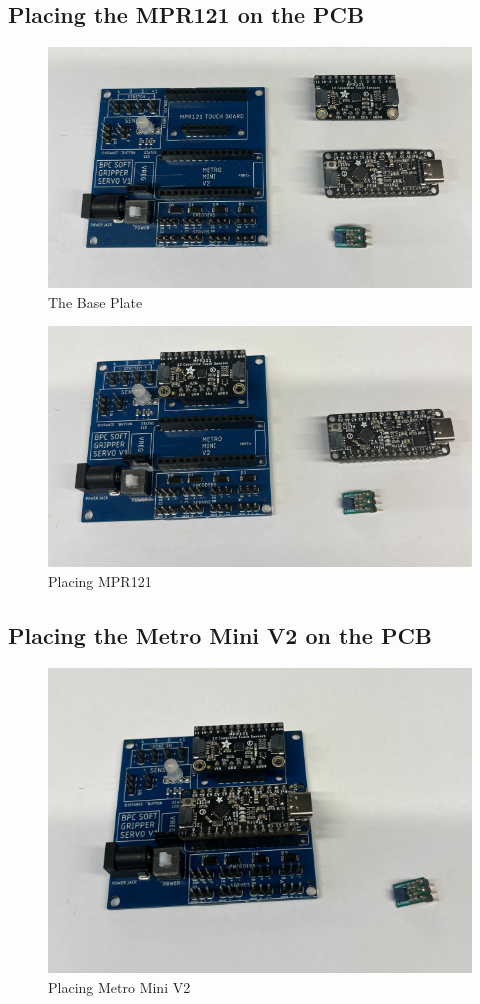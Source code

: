 \documentclass{article}
\begin{document}
\subsection{Placing the MPR121 on the PCB}
\begin{figure}[H]
    \centering
    \includegraphics[width=0.5\linewidth]{PCBImages/PlacingPCBComponents/placing_pcb_components_2.png}
    \caption{The Base Plate}
    \label{fig:enter-label}
\end{figure}
\begin{figure}[H]
    \centering
    \includegraphics[width=0.5\linewidth]{PCBImages/PlacingPCBComponents/placing_pcb_components_1.png}
    \caption{Placing MPR121}
    \label{fig:enter-label}
\end{figure}

\subsection{Placing the Metro Mini V2 on the PCB}
\begin{figure}[H]
    \centering
    \includegraphics[width=0.5\linewidth]{PCBImages/PlacingPCBComponents/placing_pcb_components_3.png}
    \caption{Placing Metro Mini V2}
    \label{fig:enter-label}
\end{figure}
\end{document}
